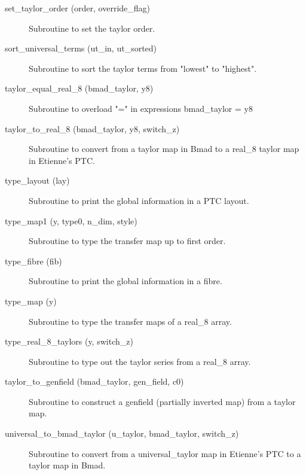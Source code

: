 \begin{description}
\label{r:set.taylor.order}
\item[set_taylor_order (order, override_flag)] \Newline
Subroutine to set the taylor order. 

\label{r:sort.universal.terms}
\item[sort_universal_terms (ut_in, ut_sorted)] \Newline
Subroutine to sort the taylor terms from "lowest" to "highest". 

\label{r:taylor.equal.real.8}
\item[taylor_equal_real_8 (bmad_taylor, y8)] \Newline
Subroutine to overload "=" in expressions bmad_taylor = y8 

\label{r:taylor.to.real.8}
\item[taylor_to_real_8 (bmad_taylor, y8, switch_z)] \Newline
Subroutine to convert from a taylor map in Bmad to a real_8 taylor map in Etienne's PTC. 

\label{r:type.layout}
\item[type_layout (lay)] \Newline
Subroutine to print the global information in a PTC layout.

\label{r:type.map1}
\item[type_map1 (y, type0, n_dim, style)] \Newline
Subroutine to type the transfer map up to first order. 

\label{r:type.fibre}
\item[type_fibre (fib)] \Newline
Subroutine to print the global information in a fibre.

\label{r:type.map}
\item[type_map (y)] \Newline
Subroutine to type the transfer maps of a real_8 array. 

\label{r:type.real.8.taylors}
\item[type_real_8_taylors (y, switch_z)] \Newline
Subroutine to type out the taylor series from a real_8 array. 

\label{r:taylor.to.genfield}
\item[taylor_to_genfield (bmad_taylor, gen_field, c0)] \Newline
Subroutine to construct a genfield (partially inverted map) from a taylor map. 

\label{r:universal.to.bmad.taylor}
\item[universal_to_bmad_taylor (u_taylor, bmad_taylor, switch_z)] \Newline
Subroutine to convert from a universal_taylor map in Etienne's PTC to a taylor map in Bmad. 


\end{description}
